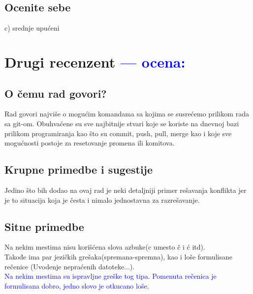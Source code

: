 \documentclass[a4paper]{report}
\newcommand{\odgovor}[1]{\textcolor{blue}{#1}}
\begin{document}
\section{Ocenite sebe}
 c) srednje upućeni



\chapter{Drugi recenzent \odgovor{--- ocena:} }

\section{O čemu rad govori?}
Rad govori najviše o mogućim komandama sa kojima se susrećemo prilikom rada sa git-om. Obuhvaćene su sve najbitnije stvari koje se koriste na dnevnoj bazi prilikom programiranja kao što su commit, push, pull, merge kao i koje sve mogućnosti postoje za resetovanje promena ili komitova. 
\section{Krupne primedbe i sugestije}
Jedino što bih dodao na ovaj rad je neki detaljniji primer rešavanja konflikta jer je to situacija koja je česta i nimalo jednostavna za razrešavanje.
\section{Sitne primedbe}
Na nekim mestima nisu korišćena slova azbuke(c umesto č i ć itd). \\
Takođe ima par jezičkih grešaka(spremana-spremna), kao i loše formulisane rečenice (Uvodenje nepraćenih datoteke...). \\
\odgovor{Na nekim mestima su ispravljne greške tog tipa. Pomenuta rečenica je formulisana dobro, jedno slovo je otkucano loše.}\\
\end{document}
